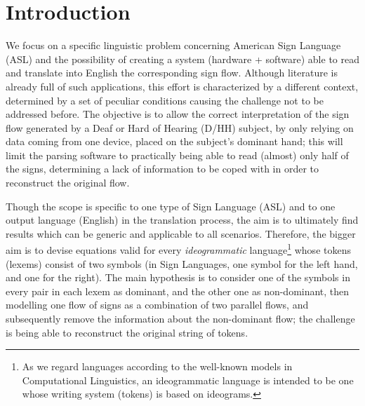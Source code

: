 
\section{Introduction}
\label{sec:intro}

We focus on a specific linguistic problem concerning American Sign Language (ASL) and the possibility
of creating a system (hardware + software) able to read and translate into English the corresponding sign
flow. Although literature is already full of such applications, this effort is characterized by a different context, 
determined
by a set of peculiar conditions causing the challenge not to be addressed before. 
The objective is to allow the correct
interpretation of the sign flow generated by a Deaf or Hard of Hearing (D/HH) subject, by only relying on 
data coming from
one device, placed on the subject's dominant hand; this will limit the parsing software to practically being able
to read (almost) only half of the signs, determining a lack of information to be coped with in order to
reconstruct the original flow.

Though the scope is specific to one type of Sign Language (ASL) 
and to one output language (English) in the translation
process, the aim is to ultimately find results which can be generic and applicable to all scenarios. Therefore,
the bigger aim is to devise equations valid for every 
\textit{ideogrammatic} language\footnote{As we regard languages according to the well-known 
models in Computational Linguistics, an ideogrammatic language is intended to be one whose
writing system (tokens) is based on ideograms.} whose tokens (lexems) consist
of two symbols (in Sign Languages, one symbol for the left hand, and one for the right). 
The main hypothesis is to consider one of the symbols in every pair in each lexem as
dominant, and the other one as non-dominant, then modelling one flow of signs as a combination of two
parallel flows, and subsequently remove the information about the non-dominant
flow; the challenge is being able to reconstruct the original string of tokens.
